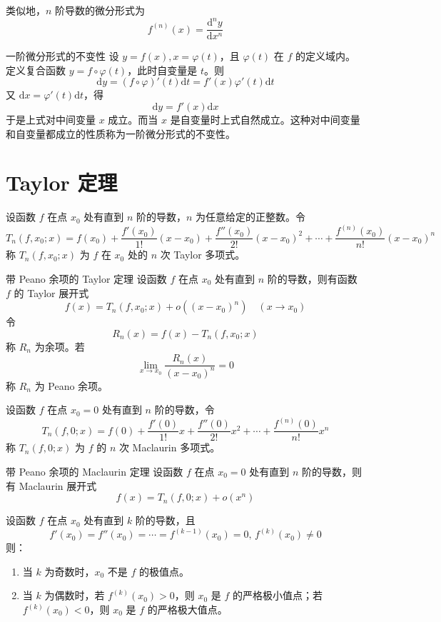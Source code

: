 类似地，$n$ 阶导数的微分形式为
\[f^{(n)}(x) = \frac{\mathrm{d}^{n}y}{\mathrm{d}x^n}\]

\begin{proposition}{一阶微分形式的不变性}
  设 $y = f(x), x = \varphi(t)$，且 $\varphi(t)$ 在 $f$ 的定义域内。定义复合函数 $y = f \circ \varphi(t)$，此时自变量是 $t$。则
  \[\mathrm{d}y = (f\circ\varphi)'(t)\mathrm{d}t = f'(x)\varphi'(t)\mathrm{d}t\]
  又 $\mathrm{d}x = \varphi'(t)\mathrm{d}t$，得
  \[\mathrm{d}y = f'(x)\mathrm{d}x\]
  于是上式对中间变量 $x$ 成立。而当 $x$ 是自变量时上式自然成立。这种对中间变量和自变量都成立的性质称为一阶微分形式的不变性。
\end{proposition}

\section{Taylor 定理}

\begin{definition}
  设函数 $f$ 在点 $x_0$ 处有直到 $n$ 阶的导数，$n$ 为任意给定的正整数。令
  \[T_n(f,x_0;x) = f(x_0) + \frac{f'(x_0)}{1!}(x - x_0) + \frac{f''(x_0)}{2!}(x - x_0)^2 + \cdots + \frac{f^{(n)}(x_0)}{n!}(x - x_0)^n\]
  称 $T_n(f,x_0;x)$ 为 $f$ 在 $x_0$ 处的 $n$ 次 Taylor 多项式。
\end{definition}

\begin{theorem}{带 Peano 余项的 Taylor 定理}
  设函数 $f$ 在点 $x_0$ 处有直到 $n$ 阶的导数，则有函数 $f$ 的 Taylor 展开式
  \[f(x) = T_n(f,x_0;x) + o((x - x_0)^n)\quad (x \to x_0)\]
  令
  \[R_n(x) = f(x) - T_n(f,x_0;x)\]
  称 $R_n$ 为余项。若
  \[\lim_{x \to x_0}\frac{R_n(x)}{(x - x_0)^n} = 0\]
  称 $R_n$ 为 Peano 余项。
\end{theorem}

\begin{definition}
  设函数 $f$ 在点 $x_0 = 0$ 处有直到 $n$ 阶的导数，令
  \[T_n(f,0;x) = f(0) + \frac{f'(0)}{1!}x + \frac{f''(0)}{2!}x^2 + \cdots + \frac{f^{(n)}(0)}{n!}x^n\]
  称 $T_n(f,0;x)$ 为 $f$ 的 $n$ 次 Maclaurin 多项式。
\end{definition}

\begin{theorem}{带 Peano 余项的 Maclaurin 定理}
  设函数 $f$ 在点 $x_0 = 0$ 处有直到 $n$ 阶的导数，则有 Maclaurin 展开式
  \[f(x) = T_n(f,0;x) + o(x^n)\]
\end{theorem}

\begin{theorem}
  设函数 $f$ 在点 $x_0$ 处有直到 $k$ 阶的导数，且
  \[f'(x_0) = f''(x_0) = \cdots = f^{(k - 1)}(x_0) = 0,\, f^{(k)}(x_0) \ne 0\]
  则：
  \begin{enumerate}
    \item 当 $k$ 为奇数时，$x_0$ 不是 $f$ 的极值点。
    \item 当 $k$ 为偶数时，若 $f^{(k)}(x_0) > 0$，则 $x_0$ 是 $f$ 的严格极小值点；若 $f^{(k)}(x_0) < 0$，则 $x_0$ 是 $f$ 的严格极大值点。
  \end{enumerate}
\end{theorem}

